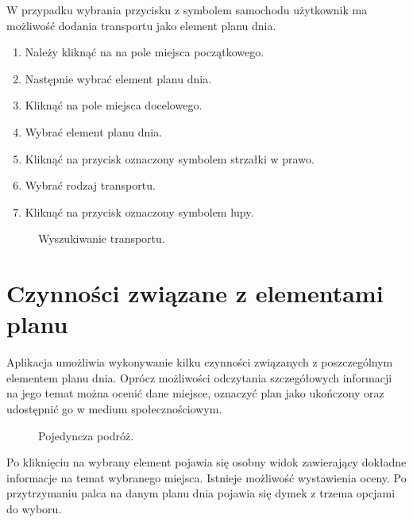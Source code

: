 W przypadku wybrania przycisku z symbolem samochodu użytkownik ma możliwość dodania transportu jako element planu dnia.
\begin{enumerate}
\item Należy kliknąć na na pole miejsca początkowego.
\item Następnie wybrać element planu dnia.
\item Kliknąć na pole miejsca docelowego.
\item Wybrać element planu dnia.
\item Kliknąć na przycisk oznaczony symbolem strzałki w prawo.
\item Wybrać rodzaj transportu.
\item Kliknąć na przycisk oznaczony symbolem lupy.
\end{enumerate}

\begin{figure}[h]

\centering
\null\hfill
{}
\hfill
{}
\hfill\null

\caption{Wyszukiwanie transportu.}
\label{fig:podrecznik12}
\end{figure}
\FloatBarrier


\section{Czynności związane z elementami planu}
Aplikacja umożliwia wykonywanie kilku czynności związanych z poszczególnym elementem planu dnia. Oprócz możliwości odczytania szczegółowych informacji na jego temat można ocenić dane miejsce, oznaczyć plan jako ukończony oraz udostępnić go w medium społecznościowym.

\begin{figure}[h]

\centering
\null\hfill
{}
\hfill
{}
\hfill\null

\caption{Pojedyncza podróż.}
\label{fig:podrecznik4}
\end{figure}
\FloatBarrier



\par Po kliknięciu na wybrany element pojawia się osobny widok zawierający dokładne informacje na temat wybranego miejsca. Istnieje możliwość wystawienia oceny.
Po przytrzymaniu palca na danym planu dnia pojawia się dymek z trzema opcjami do wyboru.

